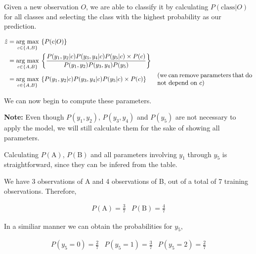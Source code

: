 \documentclass[12pt]{article}
\begin{document}
\begin{enumerate}[leftmargin=\labelsep]
\begin{enumerate}
          Given a new observation $O$, we are able to classify it by calculating $P(\text{class}|O)$ for all classes and selecting the class with the
          highest probability as our prediction.

          \begin{equation}\label{ex1-map}
              \begin{aligned}
                  \hat{z} & = \underset{c \in \{A, B\}}{\text{arg max}} \medspace \left\{P(\text{c} | O)\right\}  \\
                          & = \underset{c \in \{A, B\}}{\text{arg max}} \medspace \left\{\frac{P(y_1, y_2 | c) P(y_3, y_4 | c) P(y_5 | c) \times P(c)}{P(y_1, y_2) P(y_3, y_4) P(y_5)}\right\} \\
                          & = \underset{c \in \{A, B\}}{\text{arg max}} \medspace \left\{P(y_1, y_2 | c) P(y_3, y_4 | c) P(y_5 | c) \times P(c)\right\}
                          & \parbox{15em}{(we can remove parameters that do not depend on $c$)}
              \end{aligned}
          \end{equation}

          We can now begin to compute these parameters.

          \textbf{Note:} Even though $P(y_1, y_2)$, $P(y_3, y_4)$ and $P(y_5)$ are not necessary
          to apply the model, we will still calculate them for the sake of showing
          all parameters.

          Calculating $P(\text{A})$, $P(\text{B})$ and all parameters involving $y_1$ through
          $y_5$ is straightforward, since they can be infered from the table.

          We have 3 observations of A and 4 observations of B, out of a total of 7 training observations.
          Therefore,

          \[
              \begin{array}{cc}
                  P(\text{A}) = \frac{3}{7} &
                  P(\text{B}) = \frac{4}{7}
              \end{array}
          \]

          In a similiar manner we can obtain the probabilities for $y_5$,

          \[
              \begin{array}{ccc}
                  P(y_5 = 0) = \frac{2}{7} &
                  P(y_5 = 1) = \frac{3}{7} &
                  P(y_5 = 2) = \frac{2}{7}
              \end{array}
          \]


\end{enumerate}
\end{enumerate}
\end{document}
